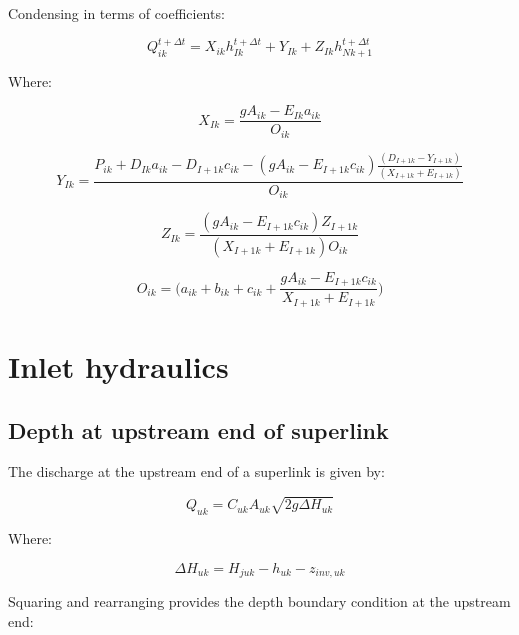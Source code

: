 \documentclass[11pt]{article}
\begin{document}
Condensing in terms of coefficients:

\begin{equation}
  \boxed{
 Q_{ik}^{t + \Delta t} = X_{ik} h_{Ik}^{t + \Delta t} + Y_{Ik} + Z_{Ik} h_{Nk + 1}^{t + \Delta t} 
 }
\end{equation}

Where:

\begin{equation}
  \boxed{
    X_{Ik} = \frac{ g A_{ik} - E_{Ik} a_{ik}}{O_{ik}}
 }
\end{equation}

\begin{equation}
  \boxed{
    Y_{Ik} = \frac{P_{ik} + D_{Ik} a_{ik}   - D_{I + 1k} c_{ik} - ( g A_{ik} - E_{I + 1k} c_{ik} ) \frac{( D_{I + 1k} - Y_{I + 1k})}{(X_{I + 1k} + E_{I + 1k})}}{O_{ik}}
 }
\end{equation}

\begin{equation}
  \boxed{
    Z_{Ik} = \frac{( g A_{ik} - E_{I + 1k} c_{ik} ) Z_{I + 1k}}{(X_{I + 1k} + E_{I + 1k}) O_{ik}}
 }
\end{equation}

\begin{equation}
  \boxed{
 O_{ik} = \biggl(a_{ik} + b_{ik} + c_{ik} + \frac{ g A_{ik} - E_{I + 1k} c_{ik} }{X_{I + 1k} + E_{I + 1k}} \biggr) 
 }
\end{equation}

\clearpage

\section{Inlet hydraulics}

\subsection{Depth at upstream end of superlink}

The discharge at the upstream end of a superlink is given by:

\begin{equation}
 Q_{uk} = C_{uk} A_{uk} \sqrt{2 g \Delta H_{uk}} 
\end{equation}

Where:

\begin{equation}
 \Delta H_{uk} = H_{juk} - h_{uk} - z_{inv, uk}
\end{equation}

Squaring and rearranging provides the depth boundary condition at the upstream end:
\end{document}
